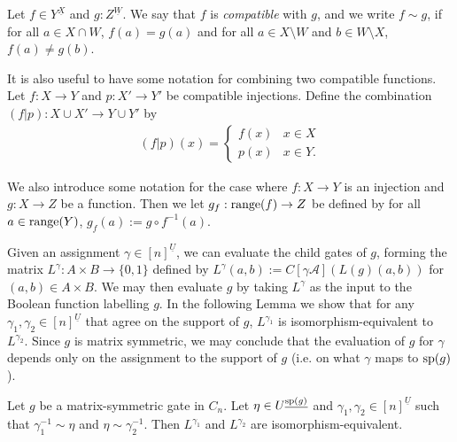 \documentclass[../paper.tex]{subfiles}
\begin{document}
\begin{definition}
  Let $f \in Y^{\underline{X}}$ and $g : Z^{\underline{W}}$. We say that $f$ is
  \emph{compatible} with $g$, and we write $f \sim g$, if for all $a \in X \cap
  W$, $f(a) = g(a)$ and for all $a \in X \setminus W$ and $b \in W \setminus X$,
  $f(a) \neq g(b)$.
\end{definition}

It is also useful to have some notation for combining two compatible functions.
Let $f : X \rightarrow Y$ and $p: X' \rightarrow Y'$ be compatible injections.
Define the combination $(f | p): X \cup X' \rightarrow Y \cup Y'$ by
\begin{align*}
  (f \vert p) (x) =
  \begin{cases}
    f (x) & x \in X \\
    p (x) & x \in Y.
  \end{cases}
\end{align*}

We also introduce some notation for the case where $f: X \rightarrow Y$ is an
injection and $g: X \rightarrow Z$ be a function. Then we let $g_f : \text{range}(f)
\rightarrow Z$ be defined by for all $a \in \text{range}(Y)$, $g_f(a) := g \circ
f^{-1}(a)$.

Given an assignment $\gamma \in [n]^{\underline{U}}$, we can evaluate the child
gates of $g$, forming the matrix $L^{\gamma} : A \times B \rightarrow \{0,1\}$
defined by $L^{\gamma} (a,b) := C[\gamma \mathcal{A}](L(g)(a,b))$ for $(a,b) \in
A \times B$. We may then evaluate $g$ by taking $L^{\gamma}$ as the input to the
Boolean function labelling $g$. In the following Lemma we show that for any
$\gamma_1, \gamma_2 \in [n]^{\underline{U}}$ that agree on the support of $g$,
$L^{\gamma_1}$ is isomorphism-equivalent to $L^{\gamma_2}$. Since $g$ is matrix
symmetric, we may conclude that the evaluation of $g$ for $\gamma$ depends only
on the assignment to the support of $g$ (i.e. on what $\gamma$ maps to
$\text{sp}(g)$).

\begin{lem}
  Let $g$ be a matrix-symmetric gate in $C_n$. Let $\eta \in
  U^{\underline{\text{sp}(g)}}$ and $\gamma_1, \gamma_2 \in [n]^{\underline{U}}$
  such that $\gamma^{-1}_1 \sim \eta$ and $\eta \sim \gamma^{-1}_2$. Then
  $L^{\gamma_1}$ and $L^{\gamma_2}$ are isomorphism-equivalent.
  \label{lem:support-determines-evaluation}
\end{lem}
\end{document}
